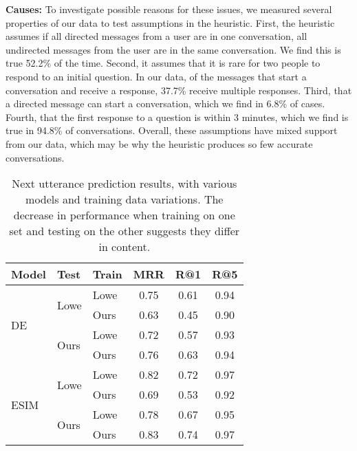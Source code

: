 \documentclass[11pt,a4paper]{article}
\newcommand{\tightparagraph}[1]{\noindent\textbf{#1:}}
\begin{document}
\tightparagraph{Causes}
To investigate possible reasons for these issues, we measured several properties of our data to test assumptions in the heuristic.
First, the heuristic assumes if all directed messages from a user are in one conversation, all undirected messages from the user are in the same conversation.
We find this is true 52.2\% of the time.
Second, it assumes that it is rare for two people to respond to an initial question.
In our data, of the messages that start a conversation and receive a response, 37.7\% receive multiple responses.
Third, that a directed message can start a conversation, which we find in 6.8\% of cases.
Fourth, that the first response to a question is within 3 minutes, which we find is true in 94.8\% of conversations.
Overall, these assumptions have mixed support from our data, which may be why the heuristic produces so few accurate conversations.

\begin{table}
  \centering
  \setlength{\tabcolsep}{5pt}
  \begin{tabular}{lllccc}
    \toprule
        Model  & Test & Train & MRR & R@1 & R@5 \\
    \midrule
        \multirow{4}{*}{DE}   & \multirow{2}{*}{Lowe} & Lowe & 0.75 & 0.61 & 0.94 \\
                              &                       & Ours & 0.63 & 0.45 & 0.90 \\
                              \cmidrule(l){3-6}
                              & \multirow{2}{*}{Ours} & Lowe & 0.72 & 0.57 & 0.93 \\
                              &                       & Ours & 0.76 & 0.63 & 0.94 \\
    \midrule
        \multirow{4}{*}{ESIM} & \multirow{2}{*}{Lowe} & Lowe & 0.82 & 0.72 & 0.97 \\
                              &                       & Ours & 0.69 & 0.53 & 0.92 \\
                              \cmidrule(l){3-6}
                              & \multirow{2}{*}{Ours} & Lowe & 0.78 & 0.67 & 0.95 \\
                              &                       & Ours & 0.83 & 0.74 & 0.97 \\
    \bottomrule
  \end{tabular}
  \caption{\label{tab:dialogue-results}
  Next utterance prediction results, with various models and training data variations.
  The decrease in performance when training on one set and testing on the other suggests they differ in content.
  }
\end{table}
\end{document}
